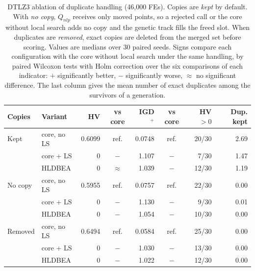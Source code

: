 \begin{table}[!htbp]
\centering
\caption{DTLZ3 ablation of duplicate handling (46{,}000 FEs). Copies are \emph{kept} by default. With \emph{no copy}, $Q_{nlp}$ receives only moved points, so a rejected call or the core without local search adds no copy and the genetic track fills the freed slot. When duplicates are \emph{removed}, exact copies are deleted from the merged set before scoring. Values are medians over 30 paired seeds. Signs compare each configuration with the core without local search under the same handling, by paired Wilcoxon tests with Holm correction over the six comparisons of each indicator: $+$ significantly better, $-$ significantly worse, $\approx$ no significant difference. The last column gives the mean number of exact duplicates among the survivors of a generation.}
\label{tab:dtlz3_duplicates}
\small
\setlength{\tabcolsep}{3pt}
\begin{tabular}{|l|l|r|c|r|c|r|r|}
\hline
\textbf{Copies} & \textbf{Variant} & \textbf{HV} & \textbf{vs core} & \textbf{IGD$^+$} & \textbf{vs core} & \textbf{HV$>0$} & \textbf{Dup. kept} \\ \hline
Kept & core, no LS & 0.6099 & ref. & 0.0748 & ref. & 20/30 & 2.69 \\
 & core + LS & 0 & $-$ & 1.107 & $-$ & 7/30 & 1.47 \\
 & HLDBEA & 0 & $\approx$ & 1.039 & $-$ & 12/30 & 1.19 \\
\hline
No copy & core, no LS & 0.5955 & ref. & 0.0757 & ref. & 22/30 & 0.00 \\
 & core + LS & 0 & $-$ & 1.130 & $-$ & 9/30 & 0.01 \\
 & HLDBEA & 0 & $-$ & 1.054 & $-$ & 10/30 & 0.00 \\
\hline
Removed & core, no LS & 0.6494 & ref. & 0.0584 & ref. & 25/30 & 0.00 \\
 & core + LS & 0 & $-$ & 1.030 & $-$ & 13/30 & 0.00 \\
 & HLDBEA & 0 & $-$ & 1.022 & $-$ & 12/30 & 0.00 \\
\hline
\end{tabular}
\end{table}
